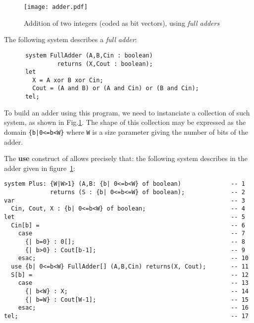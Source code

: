 \begin{figure}[!ht]
  \centerline{
    \texttt{[image: adder.pdf]}
  }
\caption{Addition of two integers (coded as bit vectors), using \emph{full adders}\label{binaryadder}}
\end{figure}

The following \alfa{} system describes a \emph{full adder}:
\begin{verbatim}
      system FullAdder (A,B,Cin : boolean) 
               returns (X,Cout : boolean);
      let
        X = A xor B xor Cin;
        Cout = (A and B) or (A and Cin) or (B and Cin);
      tel;
\end{verbatim}

To build an adder using this program, we need to 
instanciate a collection of such system,
as shown in Fig.\ref{binaryadder}. The shape of this collection may
be expressed as the {\alfa} domain \texttt{\{b|0<=b<W\}} where
\texttt{W} is a size parameter giving the number of bits of the
adder.

The \textbf{use} construct of {\alfa} allows precisely that: the
following system describes in {\alfa} the adder given in
figure~\ref{binaryadder}:

\begin{verbatim}
system Plus: {W|W>1} (A,B: {b| 0<=b<W} of boolean)              -- 1       
             returns (S : {b| 0<=b<=W} of boolean);             -- 2       
var                                                             -- 3       
  Cin, Cout, X : {b| 0<=b<W} of boolean;                        -- 4       
let                                                             -- 5       
  Cin[b] =                                                      -- 6       
    case                                                        -- 7       
      {| b=0} : 0[];                                            -- 8       
      {| b>0} : Cout[b-1];                                      -- 9       
    esac;                                                       -- 10      
  use {b| 0<=b<W} FullAdder[] (A,B,Cin) returns(X, Cout);       -- 11      
  S[b] =                                                        -- 12      
    case                                                        -- 13      
      {| b<W} : X;                                              -- 14      
      {| b=W} : Cout[W-1];                                      -- 15      
    esac;                                                       -- 16      
tel;                                                            -- 17      
\end{verbatim}

